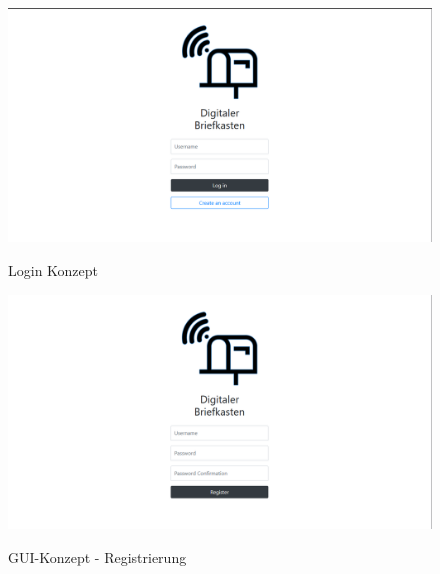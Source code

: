 \clearpage
\pagebreak


\label{GUI-Konzept}

\begin{figure}[hbt]
\centering
\begin{minipage}[t]{1\textwidth}
    \caption{Login Konzept}
    \includegraphics[width=1\textwidth]{img/login-konzept.png}\\
    \label{fig:login}
\end{minipage}
\end{figure}

\begin{figure}[h]
\centering
\begin{minipage}[t]{1\textwidth} 
\caption{GUI-Konzept - Registrierung } 
\includegraphics[width=1\textwidth]{img/registrierung-konzept.png}\\
\end{minipage}
\end{figure}

